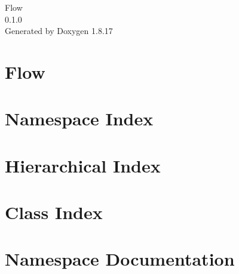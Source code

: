 \let\mypdfximage\pdfximage\def\pdfximage{\immediate\mypdfximage}\documentclass[twoside]{book}
\newcommand{\+}{\discretionary{\mbox{\scriptsize$\hookleftarrow$}}{}{}}
\newcommand{\clearemptydoublepage}{%
  \newpage{\pagestyle{empty}\cleardoublepage}%
}
\begin{document}
\hypersetup{pageanchor=false,
             bookmarksnumbered=true,
             pdfencoding=unicode
            }
\begin{titlepage}
\vspace*{7cm}
\begin{center}%
{\Large Flow \\[1ex]\large 0.\+1.\+0 }\\
\vspace*{1cm}
{\large Generated by Doxygen 1.8.17}\\
\end{center}
\end{titlepage}
\clearemptydoublepage
{}
\tableofcontents
\clearemptydoublepage
{}
\hypersetup{pageanchor=true}

\chapter{Flow}
\label{index}\hypertarget{index}{}
\chapter{Namespace Index}

\chapter{Hierarchical Index}

\chapter{Class Index}

\chapter{Namespace Documentation}




\end{document}
